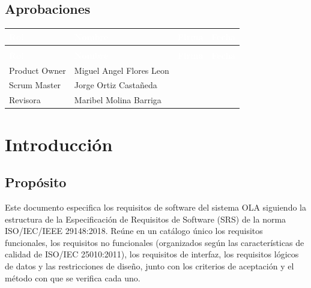 \documentclass[11pt,a4paper,oneside]{article}
\newcommand{\pie}{Página \thepage\ de \pageref*{LastPage}}
\begin{document}
\subsection*{Aprobaciones}

{\small
\begin{xltabular}{\textwidth}{@{}>{\raggedright\arraybackslash}p{3.2cm}Y>{\raggedright\arraybackslash}p{3.6cm}>{\raggedright\arraybackslash}p{2.4cm}@{}}
\textcolor{white}{\sffamily\bfseries\footnotesize Rol} & \textcolor{white}{\sffamily\bfseries\footnotesize Nombre} & \textcolor{white}{\sffamily\bfseries\footnotesize Firma} & \textcolor{white}{\sffamily\bfseries\footnotesize Fecha}\\
\endfirsthead
{}\\
\textcolor{white}{\sffamily\bfseries\footnotesize Rol} & \textcolor{white}{\sffamily\bfseries\footnotesize Nombre} & \textcolor{white}{\sffamily\bfseries\footnotesize Firma} & \textcolor{white}{\sffamily\bfseries\footnotesize Fecha}\\
\endhead
Product Owner & Miguel Angel Flores Leon &  & \\ \hline
Scrum Master & Jorge Ortiz Castañeda &  & \\ \hline
Revisora & Maribel Molina Barriga &  & \\ \hline
\end{xltabular}}
\vspace{0.6em}

\clearpage\tableofcontents\clearpage\listoftables\vspace{1cm}\listoffigures\clearpage{}\renewcommand{\pie}{Página \thepage\ de \pageref*{LastPage}}

\section{Introducción}

\subsection{Propósito}

Este documento especifica los requisitos de software del sistema OLA siguiendo la estructura de la Especificación de Requisitos de Software (SRS) de la norma ISO/IEC/IEEE 29148:2018. Reúne en un catálogo único los requisitos funcionales, los requisitos no funcionales (organizados según las características de calidad de ISO/IEC 25010:2011), los requisitos de interfaz, los requisitos lógicos de datos y las restricciones de diseño, junto con los criterios de aceptación y el método con que se verifica cada uno.
\end{document}
